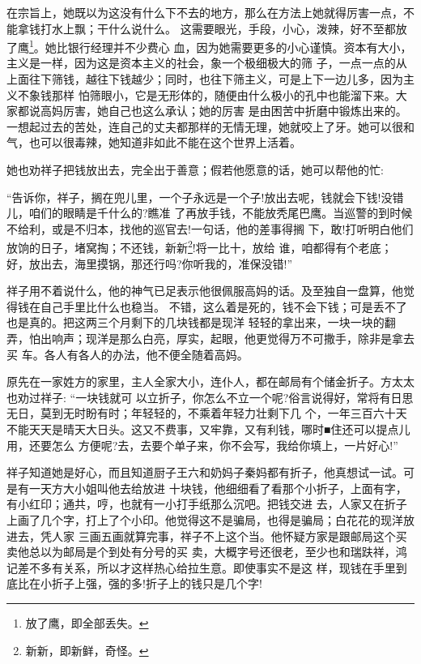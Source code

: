 \documentclass[11pt,a4paper,onecolumn]{article}
\begin{document}
在宗旨上，她既以为这没有什么下不去的地方，那么在方法上她就得厉害一点，不能拿钱打水上飘；干什么说什么。
这需要眼光，手段，小心，泼辣，好不至都放了鹰\footnote{放了鹰，即全部丢失。}。她比银行经理并不少费心
血，因为她需要更多的小心谨慎。资本有大小，主义是一样，因为这是资本主义的社会，象一个极细极大的筛
子，一点一点的从上面往下筛钱，越往下钱越少；同时，也往下筛主义，可是上下一边儿多，因为主义不象钱那样
怕筛眼小，它是无形体的，随便由什么极小的孔中也能溜下来。大家都说高妈厉害，她自己也这么承认；她的厉害
是由困苦中折磨中锻炼出来的。一想起过去的苦处，连自己的丈夫都那样的无情无理，她就咬上了牙。她可以很和
气，也可以很毒辣，她知道非如此不能在这个世界上活着。

她也劝祥子把钱放出去，完全出于善意；假若他愿意的话，她可以帮他的忙:

``告诉你，祥子，搁在兜儿里，一个子永远是一个子!放出去呢，钱就会下钱!没错儿，咱们的眼睛是千什么的?瞧准
了再放手钱，不能放秃尾巴鹰。当巡警的到时候不给利，或是不归本，找他的巡官去!一句话，他的差事得搁
下，敢!打听明白他们放饷的日子，堵窝掏；不还钱，新新\footnote{新新，即新鲜，奇怪。}!将一比十，放给
谁，咱都得有个老底；好，放出去，海里摸锅，那还行吗?你听我的，准保没错!''

祥子用不着说什么，他的神气已足表示他很佩服高妈的话。及至独自一盘算，他觉得钱在自己手里比什么也稳当。
不错，这么着是死的，钱不会下钱；可是丢不了也是真的。把这两三个月剩下的几块钱\myrule 都是现洋\myrule
轻轻的拿出来，一块一块的翻弄，怕出响声；现洋是那么白亮，厚实，起眼，他更觉得万不可撒手，除非是拿去买
车。各人有各人的办法，他不便全随着高妈。

原先在一家姓方的家里，主人全家大小，连仆人，都在邮局有个储金折子。方太太也劝过祥子: ``一块钱就可
以立折子，你怎么不立一个呢?俗言说得好，常将有日思无日，莫到无时盼有时；年轻轻的，不乘着年轻力壮剩下几
个，一年三百六十天不能天天是晴天大日头。这又不费事，又牢靠，又有利钱，哪时■住还可以提点儿用，还要怎么
方便呢?去，去要个单子来，你不会写，我给你填上，一片好心!''

祥子知道她是好心，而且知道厨子王六和奶妈子秦妈都有折子，他真想试一试。可是有一天方大小姐叫他去给放进
十块钱，他细细看了看那个小折子，上面有字，有小红印；通共，哼，也就有一小打手纸那么沉吧。把钱交进
去，人家又在折子上画了几个字，打上了个小印。他觉得这不是骗局，也得是骗局；白花花的现洋放进去，凭人家
三画五画就算完事，祥子不上这个当。他怀疑方家是跟邮局这个买卖\myrule 他总以为邮局是个到处有分号的买
卖，大概字号还很老，至少也和瑞趺祥，鸿记差不多\myrule 有关系，所以才这样热心给拉生意。即使事实不是这
样，现钱在手里到底比在小折子上强，强的多!折子上的钱只是几个字!
\end{document}
